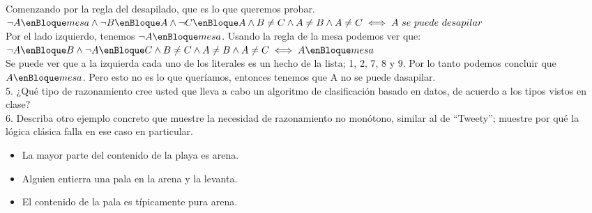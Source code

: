 Comenzando por la regla del desapilado, que es lo que queremos probar. \\ 

$\neg A \enBloque mesa \wedge \neg B \enBloque A \wedge \neg C \enBloque A \wedge B \neq C \wedge A \neq B \wedge A \neq C \iff A\ se\ puede\ desapilar$ \\

Por el lado izquierdo, tenemos $\neg A \enBloque mesa$. Usando la regla de la mesa podemos ver que: \\

$\neg A \enBloque B \wedge \neg A \enBloque C \wedge B \neq C \wedge A \neq B \wedge A \neq C \iff A \enBloque mesa$ \\

Se puede ver que a la izquierda cada uno de los literales es un hecho de la lista; 1, 2, 7, 8 y 9. Por lo tanto podemos concluir que $A \enBloque mesa$. Pero esto no es lo que queríamos, entonces tenemos que A no se puede dasapilar.\\


5. ¿Qué tipo de razonamiento cree usted que lleva a cabo un algoritmo de clasificación basado en datos, de acuerdo a los tipos vistos en clase?\\

6. Describa otro ejemplo concreto que muestre la necesidad de razonamiento no monótono, similar al de “Tweety”; muestre por qué la lógica clásica falla en ese caso en particular.

\begin{itemize}
	\item La mayor parte del contenido de la playa es arena.
	\item Alguien entierra una pala en la arena y la levanta.
	\item El contenido de la pala es típicamente pura arena.
\end{itemize}


\bigskip